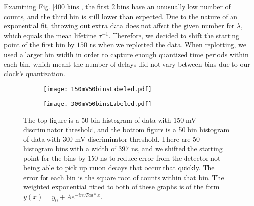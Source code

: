 \documentclass[11pt,letterpaper]{article}
\begin{document}
Examining Fig. \ref{400 bins}, the first 2 bins have an unusually low number of counts, and the third bin is still lower than expected. Due to the nature of an exponential fit, throwing out extra data does not affect the given number for $\lambda$, which equals the mean lifetime $\tau^{-1}$. Therefore, we decided to shift the starting point of the first bin by $150$ ns when we replotted the data. When replotting, we used a larger bin width in order to capture enough quantized time periods within each bin, which meant the number of delays did not vary between bins due to our clock's quantization.

\begin{figure}[hp]
    \centering
    \begin{subfigure}[b]{0.75\textwidth}
        \texttt{[image: 150mV50binsLabeled.pdf]}
        \label{fig:subfigA}
    \end{subfigure}
    \begin{subfigure}[b]{0.75\textwidth}
        \texttt{[image: 300mV50binsLabeled.pdf]}
        \label{fig:subfigB}
    \end{subfigure}
    \caption{The top figure is a 50 bin histogram of data with $150$ mV discriminator threshold, and the bottom figure is a 50 bin histogram of data with $300$ mV discriminator threshold. There are 50 histogram bins with a width of $397$ ns, and we shifted the starting point for the bins by $150$ ns to reduce error from the detector not being able to pick up muon decays that occur that quickly. The error for each bin is the square root of counts within that bin. The weighted exponential fitted to both of these graphs is of the form $y(x) = y_0 + Ae^{-invTau*x}$.}
\end{figure}
\label{50 bins}
\end{document}
